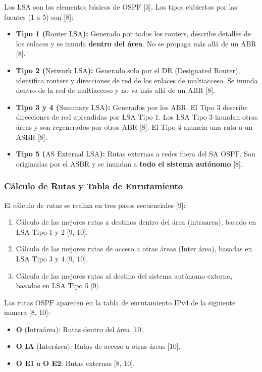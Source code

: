 \documentclass[a5paper]{book}%
\begin{document}
  Los $\text{LSA}$ son los elementos básicos de $\text{OSPF}$ [3]. Los tipos cubiertos por las fuentes (1 a 5) son [8]:
  \begin{itemize}
  	\item \textbf{Tipo 1 ($\text{Router LSA}$):} Generado por todos los routers, describe detalles de los enlaces y se inunda \textbf{dentro del área}. No se propaga más allá de un $\text{ABR}$ [8].
  	\item \textbf{Tipo 2 ($\text{Network LSA}$):} Generado solo por el $\text{DR}$ ($\text{Designated Router}$), identifica routers y direcciones de red de los enlaces de multiacceso. Se inunda dentro de la red de multiacceso y no va más allá de un $\text{ABR}$ [8].
  	\item \textbf{Tipo 3 y 4 ($\text{Summary LSA}$):} Generados por los $\text{ABR}$. El Tipo 3 describe direcciones de red aprendidas por $\text{LSA}$ Tipo 1. Los $\text{LSA}$ Tipo 3 inundan otras áreas y son regenerados por otros $\text{ABR}$ [8]. El Tipo 4 anuncia una ruta a un $\text{ASBR}$ [8].
  	\item \textbf{Tipo 5 ($\text{AS External LSA}$):} Rutas externas a redes fuera del $\text{SA}$ $\text{OSPF}$. Son originadas por el $\text{ASBR}$ y se inundan a \textbf{todo el sistema autónomo} [8].
  \end{itemize}
  
  \subsubsection*{Cálculo de Rutas y Tabla de Enrutamiento}
  
  El cálculo de rutas se realiza en tres pasos secuenciales [9]:
  \begin{enumerate}
  	\item Cálculo de las mejores rutas a destinos dentro del área ($\text{intraarea}$), basado en $\text{LSA}$ Tipo 1 y 2 [9, 10].
  	\item Cálculo de las mejores rutas de acceso a otras áreas ($\text{Inter área}$), basadas en $\text{LSA}$ Tipo 3 y 4 [9, 10].
  	\item Cálculo de las mejores rutas al destino del sistema autónomo externo, basadas en $\text{LSA}$ Tipo 5 [9].
  \end{enumerate}
  
  Las rutas $\text{OSPF}$ aparecen en la tabla de enrutamiento $\text{IPv4}$ de la siguiente manera [8, 10]:
  \begin{itemize}
  	\item \textbf{O} ($\text{Intraárea}$): Rutas dentro del área [10].
  	\item \textbf{O IA} ($\text{Interárea}$): Rutas de acceso a otras áreas [10].
  	\item \textbf{O E1} u \textbf{O E2}: Rutas externas [8, 10].
  \end{itemize}
  
\end{document}
